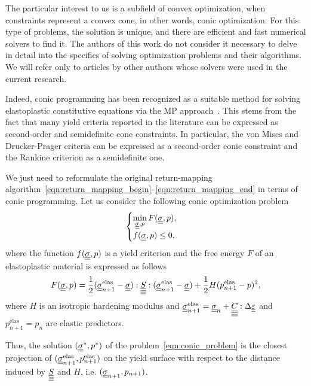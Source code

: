 \documentclass[12pt]{article}
\begin{document}
The particular interest to us is a subfield of convex optimization, when constraints represent a convex cone, in other words, conic optimization. For this type of problems, the solution is unique, and there are efficient and fast numerical solvers to find it. The authors of this work do not consider it necessary to delve in detail into the specifics of solving optimization problems and their algorithms. We will refer only to articles by other authors whose solvers were used in the current research.

Indeed, conic programming has been recognized as a suitable method for solving elastoplastic constitutive equations via the MP approach~\parencite{BRUNO2020724}. This stems from the fact that many yield criteria reported in the literature can be expressed as second-order and semidefinite cone constraints. In particular, the von Mises and Drucker-Prager criteria can be expressed as a second-order conic constraint and the Rankine criterion as a semidefinite one. 

We just need to reformulate the original return-mapping algorithm~\eqref{eqn:return_mapping_begin}--\eqref{eqn:return_mapping_end} in terms of conic programming. Let us consider the following conic optimization problem
\begin{equation}
    \label{eqn:conic_problem}
    \begin{cases}
        \min\limits_{\underline{\underline{\sigma}}, p} F(\underline{\underline{\sigma}}, p), \\
        f(\underline{\underline{\sigma}}, p) \leq 0,
    \end{cases}
\end{equation}
where the function $f(\underline{\underline{\sigma}}, p)$ is a yield criterion and the free energy $F$ of an elastoplastic material is expressed as follows
\begin{equation}
    F(\underline{\underline{\sigma}}, p) = \frac{1}{2}(\underline{\underline{\sigma}}_{n+1}^{\text{elas}} - \underline{\underline{\sigma}}) : \underline{\underline{\underline{\underline{S}}}} : (\underline{\underline{\sigma}}_{n+1}^{\text{elas}} - \underline{\underline{\sigma}}) + \frac{1}{2}H(p_{n+1}^\text{elas} - p)^2,
\end{equation}
where $H$ is an isotropic hardening modulus and $\underline{\underline{\sigma}}_{n+1}^{\text{elas}} = \underline{\underline{\sigma}}_n + \underline{\underline{\underline{\underline{C_{}}}}}:\Delta\underline{\underline{\varepsilon}}$ and $p^\text{elas}_{n+1} = p_n$ are elastic predictors.

Thus, the solution $(\underline{\underline{\sigma}}^*, p^*)$ of the problem~\eqref{eqn:conic_problem} is the closest projection of $(\underline{\underline{\sigma}}_{n+1}^{\text{elas}}, p_{n+1}^\text{elas})$ on the yield surface with respect to the distance induced by $\underline{\underline{\underline{\underline{S}}}}$ and $H$, i.e. $(\underline{\underline{\sigma}}_{n+1}, p_{n+1})$.

\end{document}
